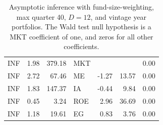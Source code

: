\documentclass[12pt]{article}
\begin{document}
\begin{table}[ht]
\begin{tabular}{lrrlrrr}
		\hline
		INF & 1.98 & 379.18 & MKT &  &  & 0.00 \\ 
		INF & 2.72 & 67.46 & ME & -1.27 & 13.57 & 0.00 \\ 
		INF & 1.83 & 147.37 & IA & -0.44 & 9.84 & 0.00 \\ 
		INF & 0.45 & 3.24 & ROE & 2.96 & 36.69 & 0.00 \\ 
		INF & 1.18 & 19.61 & EG & 0.83 & 3.76 & 0.00 \\ 
		\hline
		\hline
	\end{tabular}
	\caption{Asymptotic inference with fund-size-weighting, max quarter 40, $D=12$, and vintage year portfolios. The Wald test null hypothesis is a MKT coefficient of one, and zeros for all other coefficients.} 
	\label{tab:ai_40_fw_dep_vyp}
\end{table}
\end{document}
